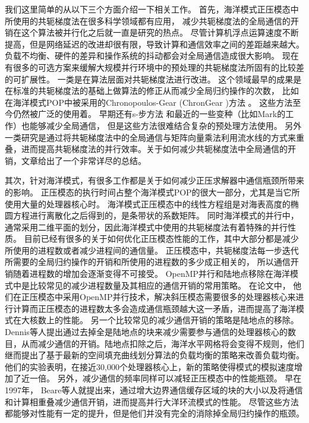 我们这里简单的从以下三个方面介绍一下相关工作。
首先，海洋模式正压模态中所使用的共轭梯度法在很多科学领域都有应用，
减少共轭梯度法的全局通信的开销在这个算法被并行化之后就一直是研究的热点。 
尽管计算机浮点运算速度不断提高，但是网络延迟的改进却很有限，导致计算和通信效率之间的差距越来越大。
负载不均衡、硬件的差异和操作系统的抖动都会对全局通信造成很大影响\cite{ghysels2014}。 
现在有很多的可选方案来缓解大规模并行环境中的预处理的共轭梯度法所固有的比较差的可扩展性。
一类是在算法层面对共轭梯度法进行改进。 
这个领域最早的成果是在标准的共轭梯度法的基础上做算法的修正从而减少全局归约操作的次数， 比如在海洋模式POP中被采用的Chronopoulos-Gear (ChronGear \cite{dAzevedo1999lapack})方法 。 这些方法至今仍然被广泛的使用着。 
早期还有s-步方法\cite{chron1989} 和最近的一些变种（比如Mark的工作\cite{hoemmen2010}）也能够减少全局通信， 但是这些方法很难结合复杂的预处理方法使用。
另外一类研究是通过将共轭梯度法中的全局通信与矩阵向量乘法利用流水线的方式来重叠，进而提高共轭梯度法的并行效率。关于如何减少共轭梯度法中全局通信的开销，文章给出了一个非常详尽的总结。
 



其次，针对海洋模式，有很多工作都是关于如何减少正压求解器中通信瓶颈所带来的影响。
正压模态的执行时间占整个海洋模式POP的很大一部分，尤其是当它所使用大量的处理器核心时。
海洋模式正压模态中的线性方程组是对海表高度的椭圆方程进行离散化之后得到的，是条带状的系数矩阵。
同时海洋模式的并行中，通常采用二维平面的划分，因此海洋模式中使用的共轭梯度法有着特殊的并行性质。
目前已经有很多的关于如何优化正压模态性能的工作，其中大部分都是减少所使用的进程数或者减少进程间的通信量。 
正压模态中，共轭梯度法每一步迭代所需要的全局归约操作的开销和所使用的进程数的多少成正相关的， 所以通信开销随着进程数的增加会逐渐变得不可接受。
OpenMP并行和陆地点移除在海洋模式中是比较常见的减少进程数量及其相应的通信开销的常用策略。  
在论文中， 他们在正压模态中采用OpenMP并行技术，解决斜压模态需要很多的处理器核心来进行计算而正压模态的进程数太多会造成通信瓶颈越大这一矛盾，进而提高了海洋模式在大核数上的性能。 
另一个比较常见的减少通信开销的策略是陆地点的移除\cite{dennis2007inverse,dennis2008scaling}。 
Dennis等人提出通过去掉全是陆地点的块来减少需要参与通信的处理器核心的数目，从而减少通信的开销。陆地点扣除之后，海洋水平网格将会变得不规则，他们继而提出了基于最新的空间填充曲线划分算法的负载均衡的策略来改善负载均衡。 
他们的实验表明，在接近30,000个处理器核心上，新的策略使得模式的模拟速度增加了近一倍。 
另外，减少通信的频率同样可以减轻正压模态中的性能瓶颈。 
早在1997年，  Beare\cite{beare1997optimisation}等人就提出来，通过增大边界通信缓存区域的块的大小以及将通信和计算相重叠减少通信开销，进而提高并行大洋环流模式的性能。  
尽管这些方法都能够对性能有一定的提升，但是他们并没有完全的消除掉全局归约操作的瓶颈。 

